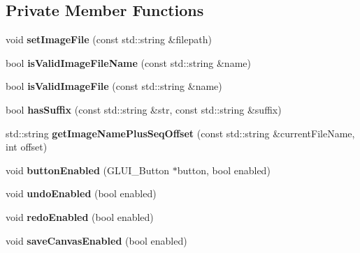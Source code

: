 \subsection*{Private Member Functions}
\begin{DoxyCompactItemize}
\item 
\hypertarget{classMIAApp_abedcd0557f3b0204325cd4bcca276340}{void {\bfseries set\-Image\-File} (const std\-::string \&filepath)}\label{classMIAApp_abedcd0557f3b0204325cd4bcca276340}

\item 
\hypertarget{classMIAApp_ad5b10911bb27d75369ad862e3b2ddebf}{bool {\bfseries is\-Valid\-Image\-File\-Name} (const std\-::string \&name)}\label{classMIAApp_ad5b10911bb27d75369ad862e3b2ddebf}

\item 
\hypertarget{classMIAApp_a398a146bbe6183734c7ed3315564ac24}{bool {\bfseries is\-Valid\-Image\-File} (const std\-::string \&name)}\label{classMIAApp_a398a146bbe6183734c7ed3315564ac24}

\item 
\hypertarget{classMIAApp_a83b411e84479e41c2bc76e6d8ff35378}{bool {\bfseries has\-Suffix} (const std\-::string \&str, const std\-::string \&suffix)}\label{classMIAApp_a83b411e84479e41c2bc76e6d8ff35378}

\item 
\hypertarget{classMIAApp_a9078ec25d516d07f95a2f0c0754e4910}{std\-::string {\bfseries get\-Image\-Name\-Plus\-Seq\-Offset} (const std\-::string \&current\-File\-Name, int offset)}\label{classMIAApp_a9078ec25d516d07f95a2f0c0754e4910}

\item 
\hypertarget{classMIAApp_abdc30baa79b2e615855e9d6f53161991}{void {\bfseries button\-Enabled} (G\-L\-U\-I\-\_\-\-Button $\ast$button, bool enabled)}\label{classMIAApp_abdc30baa79b2e615855e9d6f53161991}

\item 
\hypertarget{classMIAApp_a7c78fda6a6f85758742bc29529daea91}{void {\bfseries undo\-Enabled} (bool enabled)}\label{classMIAApp_a7c78fda6a6f85758742bc29529daea91}

\item 
\hypertarget{classMIAApp_a1053652334f77c2abab878a61f833d02}{void {\bfseries redo\-Enabled} (bool enabled)}\label{classMIAApp_a1053652334f77c2abab878a61f833d02}

\item 
\hypertarget{classMIAApp_ac7399aaf822439f5878b65eb3733504a}{void {\bfseries save\-Canvas\-Enabled} (bool enabled)}\label{classMIAApp_ac7399aaf822439f5878b65eb3733504a}


\end{DoxyCompactItemize}
